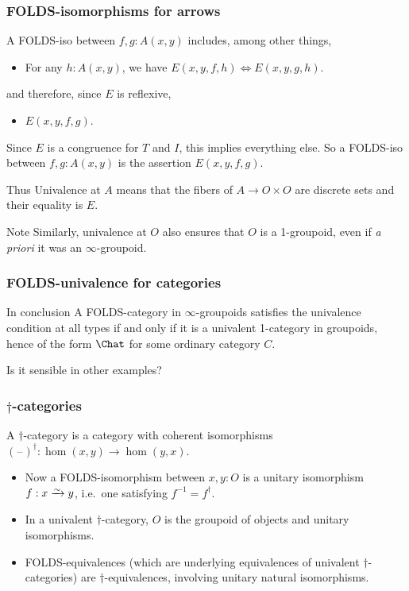 \documentclass{beamer}
\newcommand{\blank}{\mathord{\hspace{1pt}\text{--}\hspace{1pt}}}
\begin{document}
\begin{frame}
  \frametitle{FOLDS-isomorphisms for arrows}
  A FOLDS-iso between $f,g:A(x,y)$ includes, among other things,
  \begin{itemize}
  \item For any $h:A(x,y)$, we have $E(x,y,f,h) \iff E(x,y,g,h)$.
  \end{itemize}
  and therefore, since $E$ is reflexive,
  \begin{itemize}
  \item $E(x,y,f,g)$.
  \end{itemize}
  \pause
  Since $E$ is a congruence for $T$ and $I$, this implies everything else.
  So \alert{a FOLDS-iso between $f,g:A(x,y)$ is the assertion $E(x,y,f,g)$.}
  \begin{block}{Thus}
    Univalence at $A$ means that the fibers of $A\to O\times O$ are discrete sets and their equality is $E$.
  \end{block}
  \pause
  \begin{block}{Note}
    Similarly, univalence at $O$ also ensures that $O$ is a 1-groupoid, even if \textit{a priori} it was an $\infty$-groupoid.
  \end{block}
\end{frame}

\begin{frame}
  \frametitle{FOLDS-univalence for categories}
  \begin{block}{In conclusion}
    A FOLDS-category in $\infty$-groupoids satisfies the univalence condition at all types if and only if it is a univalent 1-category in groupoids, hence of the form $\Chat$ for some ordinary category $C$.
  \end{block}
  \pause
  Is it sensible in other examples?
\end{frame}

\begin{frame}[t]
  \frametitle{$\dagger$-categories}
  \begin{definition}
    A \alert<1>{$\dagger$-category} is a category with coherent isomorphisms $(\blank)^\dagger : \hom(x,y) \to \hom(y,x)$.
  \end{definition}
  \pause
  \begin{itemize}
  \item Now a FOLDS-isomorphism between $x,y:O$ is a \alert<2>{unitary isomorphism} $f:x\toiso y$, i.e.\ one satisfying $f^{-1} = f^\dagger$.
    \pause
  \item In a univalent $\dagger$-category, $O$ is the groupoid of objects and unitary isomorphisms.
  \item FOLDS-equivalences (which are underlying equivalences of univalent $\dagger$-categories) are \alert{$\dagger$-equivalences}, involving unitary natural isomorphisms.
  \end{itemize}
\end{frame}
\end{document}
